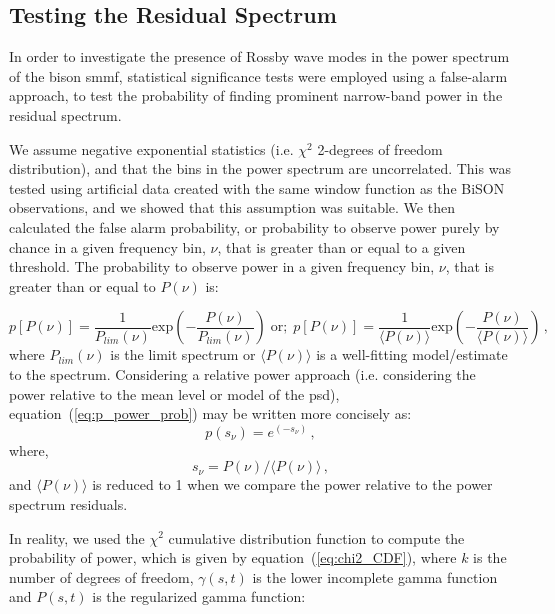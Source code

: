 \subsection{Testing the Residual Spectrum}
In order to investigate the presence of Rossby wave modes in the power spectrum of the \gls{bison} \gls{smmf}, statistical significance tests were employed using a false-alarm approach, to test the probability of finding prominent narrow-band power in the residual spectrum.

We assume negative exponential statistics (i.e. $\chi^2$ 2-degrees of freedom distribution), and that the bins in the power spectrum are uncorrelated. This was tested using artificial data created with the same window function as the BiSON observations, and we showed that this assumption was suitable. We then calculated the false alarm probability, or probability to observe power purely by chance in a given frequency bin, $\nu$, that is greater than or equal to a given threshold. The probability to observe power in a given frequency bin, $\nu$, that is greater than or equal to $P(\nu)$ is:

\begin{equation}
p[P(\nu)] = \frac{1}{P_{lim}(\nu)} \mathrm{exp}\left(-\frac{P(\nu)}{P_{lim}(\nu)}\right) \; \mathrm{or; } \; p[P(\nu)] = \frac{1}{\langle P(\nu) \rangle} \mathrm{exp}\left(-\frac{P(\nu)}{\langle P(\nu) \rangle}\right) \, ,
\label{eq:p_power_prob}
\end{equation}
%
where $P_{lim}(\nu)$ is the limit spectrum or $\langle P(\nu) \rangle$ is a well-fitting model/estimate to the spectrum. Considering a relative power approach (i.e. considering the power relative to the mean level or model of the \gls{psd}), equation~(\ref{eq:p_power_prob}) may be written more concisely as:
%
\begin{equation}
p(s_{\nu}) = e^{(-s_{\nu})} \, ,
\label{eq:p_power_prob_concise}
\end{equation}
%
where,
%
\begin{equation}
s_{\nu} = P(\nu)/\langle P(\nu) \rangle \, ,
\label{eq:s_v}
\end{equation}
%
and $\langle P(\nu) \rangle$ is reduced to 1 when we compare the power relative to the power spectrum residuals.

In reality, we used the $\chi^2$ cumulative distribution function to compute the probability of power, which is given by equation~(\ref{eq:chi2_CDF}), where $k$ is the number of degrees of freedom, $\gamma(s,t)$ is the lower incomplete gamma function and $P(s,t)$ is the regularized gamma function: 

